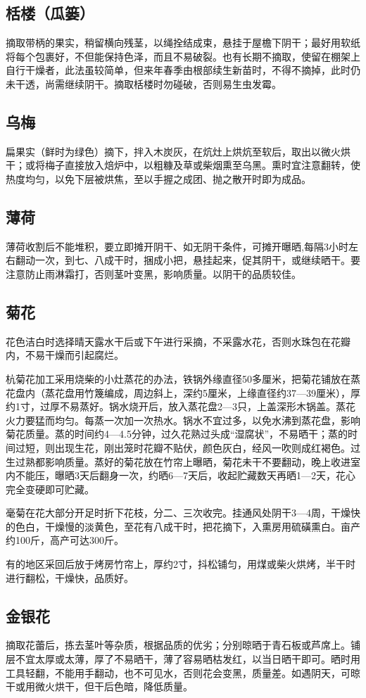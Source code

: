 \documentclass{ctexbook}
\begin{document}
\subsection{栝楼（瓜篓）}
摘取带柄的果实，稍留横向残茎，以绳拴结成束，悬挂于屋檐下阴干；最好用软纸将每个包裹好，不但能保持色泽，而且不易破裂。也有长期不摘取，使留在棚架上自行干燥者，此法虽较简单，但来年春季由根部续生新苗时，不得不摘掉，此时仍未干透，尚需继续阴干。摘取栝楼时勿碰破，否则易生虫发霉。
\subsection{乌梅}
扁果实（鲜时为绿色）摘下，拌入木炭灰，在炕灶上烘炕至软后，取出以微火烘干；或将梅子直接放入焙炉中，以粗糠及草或柴烟熏至乌黑。熏时宜注意翻转，使热度均匀，以免下层被烘焦，至以手握之成团、抛之散开时即为成品。
\subsection{薄荷}
薄荷收割后不能堆积，要立即摊开阴干、如无阴干条件，可摊开曝晒,每隔3小时左右翻动一次，到七、八成干时，捆成小把，悬挂起来，促其阴干，或继续晒干。要注意防止雨淋霜打，否则茎叶变黑，影响质量。以阴干的品质较佳。
\subsection{菊花}
花色洁白时选择晴天露水干后或下午进行采摘，不采露水花，否则水珠包在花瓣内，不易干燥而引起腐烂。

杭菊花加工采用烧柴的小灶蒸花的办法，铁锅外缘直径50多厘米，把菊花铺放在蒸花盘内（蒸花盘用竹篾编成，周边斜上，深约5厘米，上缘直径约37—39厘米），厚约1寸，过厚不易蒸好。锅水烧开后，放入蒸花盘2—3只，上盖深形木锅盖。蒸花火力要猛而均匀。每蒸一次加一次热水。锅水不宜过多，以免水沸到蒸花盘，影响菊花质量。蒸的时间约4—4.5分钟，过久花熟过头成“湿腐状”，不易晒干；蒸的时间过短，则出现生花，刚出笼时花瓣不贴伏，颜色灰白，经风一吹则成红褐色。过生过熟都影响质量。蒸好的菊花放在竹帘上曝晒，菊花未干不要翻动，晚上收进室内不能压，曝晒3天后翻身一次，约晒6—7天后，收起贮藏数天再晒1—2天，花心完全变硬即可贮藏。

毫菊在花大部分开足时折下花枝，分二、三次收完。挂通风处阴干3—4周，干燥快的色白，干燥慢的淡黄色，至花有八成干时，把花摘下，入熏房用硫磺熏白。亩产约100斤，高产可达300斤。

有的地区采回后放于烤房竹帘上，厚约2寸，抖松铺匀，用煤或柴火烘烤，半干时进行翻松，干燥快，品质好。
\subsection{金银花}
摘取花蕾后，拣去茎叶等杂质，根据品质的优劣；分别晾晒于青石板或芦席上。铺层不宜太厚或太薄，厚了不易晒干，薄了容易晒枯发红，以当日晒干即可。晒时用工具轻翻，不能用手翻动，也不可见水，否则花会变黑，质量差。如遇阴天，可晾干或用微火烘干，但干后色暗，降低质量。
\end{document}
